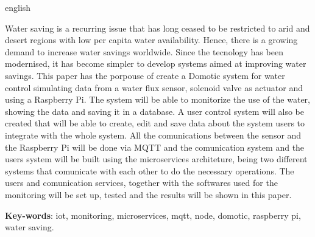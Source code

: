 \documentclass[
	12pt,				%
	oneside,
	a4paper,			%
	english,			%
	brazil				%
	]{abntex2ufop} %
\begin{document}
\begin{resumo}[Abstract]
  \begin{otherlanguage*}{english}

 \noindent Water saving is a recurring issue that has long ceased to be restricted to arid and desert regions with low per capita water availability. Hence, there is a growing demand to increase water savings worldwide. Since the tecnology has been modernised, it has become simpler to develop systems aimed at improving water savings. This paper has the porpouse of create a Domotic system for water control simulating data from a water flux sensor, solenoid valve as actuator and using a Raspberry Pi. The system will be able to monitorize the use of the water, showing the data and saving it in a database. A user control system will also be created that will be able to create, edit and save data about the system users to integrate with the whole system. All the comunications between the sensor and the Raspberry Pi will be done via MQTT and the comunication system and the users system will be built using the microservices architeture, being two different systems that comunicate with each other to do the necessary operations. The users and comunication services, together with the softwares used for the monitoring will be set up, tested and the results will be shown in this paper.

   \vspace{\onelineskip}
 
   \noindent 
   \textbf{Key-words}: iot, monitoring, microservices, mqtt, node, domotic, raspberry pi, water saving.
  \end{otherlanguage*}
\end{resumo}

% 
%
%  
\end{document}
